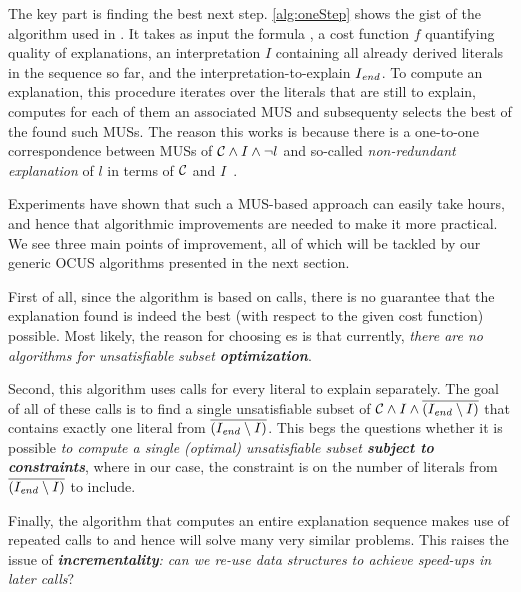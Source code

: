 The key part is finding the best next step. \cref{alg:oneStep} shows the gist of the algorithm used in \cite{ecai/BogaertsGCG20}.
It takes as input the formula \formulac, a cost function $f$ quantifying quality of explanations, an interpretation $I$ containing all already derived literals in the sequence so far, and the interpretation-to-explain $I_\mathit{end} $. 
To compute an explanation, this procedure iterates over the literals that are still to explain, computes for each of them an associated MUS and subsequenty selects the best of the found such MUSs.  
The reason this works is because there is a one-to-one correspondence between MUSs of $\mathcal{C}  \land I \land \neg l$ and so-called \emph{non-redundant explanation} of $l$ in terms of $\mathcal{C} $ and $I$~\cite{ecai/BogaertsGCG20}. 

Experiments have shown that such a MUS-based approach can easily take hours, and hence that algorithmic improvements are needed to make it more practical. 
We see three main points of improvement, all of which will be tackled by our generic OCUS algorithms presented in the next section. 
\begin{inparaenum}
 \item First of all, since the algorithm is based on  calls, there is no guarantee that the explanation found is indeed the best (with respect to the given cost function) possible. 
 Most likely, the reason for choosing es is that currently, \textit{there are no algorithms for unsatisfiable subset \textbf{optimization}}. 
 \item Second, this algorithm uses  calls for every literal to explain separately. The goal of all of these calls is to find a single unsatisfiable subset of $\mathcal{C}  \land I \land \overline{(I_\mathit{end} \setminus I)}$ that contains exactly one literal from $\overline{(I_\mathit{end} \setminus I)}$. This begs the questions whether it is possible \textit{to compute a single (optimal) unsatisfiable subset \textbf{subject to constraints}}, where in our case, the constraint is on the number of literals from $\overline{(I_\mathit{end} \setminus I)}$ to include. 
 \item Finally, the algorithm that computes an entire explanation sequence makes use of repeated calls to \onestep and hence will solve many very similar problems. This raises the issue of \textit{\textbf{incrementality}: can we re-use data structures to achieve speed-ups in later calls}? 
\end{inparaenum}


